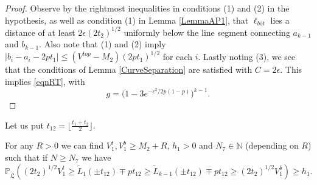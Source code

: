 	\begin{proof}
		
		Observe by the rightmost inequalities in conditions (1) and (2) in the hypothesis, as well as condition (1) in Lemma \ref{LemmaAP1}, that $\ell_{bot}$ lies a distance of at least $2\epsilon(2t_2)^{1/2}$ uniformly below the line segment connecting $a_{k-1}$ and $b_{k-1}$. Also note that (1) and (2) imply $|b_i-a_i-2pt_1| \leq (V^{top} - M_2)(2pt_1)^{1/2}$ for each $i$. Lastly noting (3), we see that the conditions of Lemma \ref{CurveSeparation} are satisfied with $C = 2\epsilon$. This implies \eqref{eqnRT}, with
		\[
		g = \big(1 - 3e^{-\epsilon^2/2p(1-p)}\big)^{k-1}.
		\]
		
	\end{proof}

Let us put $t_{12} = \lfloor \frac{t_1 + t_2}{2} \rfloor$.

\begin{lemma}\label{LemmaBP2} For any $R > 0$ we can find $V_1^t, V_1^b \geq M_2 + R$, $h_1 > 0$ and $N_7 \in \mathbb{N}$ (depending on $R$) such that if $N \geq N_7$ we have
		\begin{equation}\label{eqnRT2}
		\mathbb{P}_{\tilde{\mathfrak{L}}} \left(  (2t_2)^{1/2} V_1^t \geq \tilde{L}_1(\pm t_{12}) \mp p t_{12} \geq \tilde{L}_{k-1}(\pm t_{12}) \mp p t_{12} \geq (2t_2)^{1/2} V_1^b  \right) \geq h_1.
		\end{equation}
	
\end{lemma}

